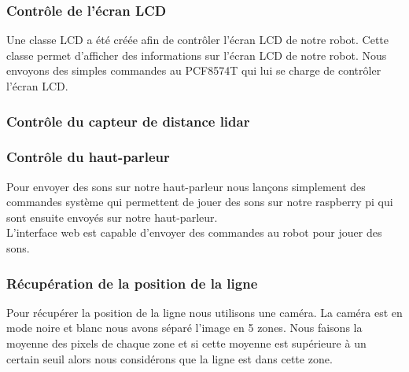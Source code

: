 \subsubsection*{Contrôle de l'écran LCD}
Une classe LCD a été créée afin de contrôler l'écran LCD de notre robot. Cette classe permet d'afficher des informations sur l'écran LCD de notre robot.
Nous envoyons des simples commandes au PCF8574T qui lui se charge de contrôler l'écran LCD.

\subsubsection*{Contrôle du capteur de distance lidar}
\lipsum[1-2]
\subsubsection*{Contrôle du haut-parleur}
Pour envoyer des sons sur notre haut-parleur nous lançons simplement des commandes système qui permettent de jouer des sons sur notre raspberry pi qui sont ensuite envoyés sur notre haut-parleur.
\\
L'interface web est capable d'envoyer des commandes au robot pour jouer des sons.

\subsubsection*{Récupération de la position de la ligne}
Pour récupérer la position de la ligne nous utilisons une caméra. La caméra est en mode noire et blanc nous avons séparé l'image en 5 zones.
Nous faisons la moyenne des pixels de chaque zone et si cette moyenne est supérieure à un certain seuil alors nous considérons que la ligne est dans cette zone.



